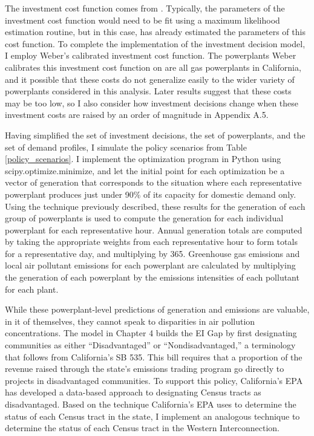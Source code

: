 The investment cost function comes from \cite{weber2021dynamic}. Typically, the parameters of the investment cost function would need to be fit using a maximum likelihood estimation routine, but in this case, \cite{weber2021dynamic} has already estimated the parameters of this cost function. To complete the implementation of the investment decision model, I employ Weber's calibrated investment cost function. The powerplants Weber calibrates this investment cost function on are all gas powerplants in California, and it possible that these costs do not generalize easily to the wider variety of powerplants considered in this analysis. Later results suggest that these costs may be too low, so I also consider how investment decisions change when these investment costs are raised by an order of magnitude in Appendix A.5. 

Having simplified the set of investment decisions, the set of powerplants, and the set of demand profiles, I simulate the policy scenarios from Table \ref{policy_scenarios}. I implement the optimization program in Python using scipy.optimize.minimize, and let the initial point for each optimization be a vector of generation that corresponds to the situation where each representative powerplant produces just under 90\% of its capacity for domestic demand only. Using the technique previously described, these results for the generation of each group of powerplants is used to compute the generation for each individual powerplant for each representative hour. Annual generation totals are computed by taking the appropriate weights from each representative hour to form totals for a representative day, and multiplying by 365. Greenhouse gas emissions and local air pollutant emissions for each powerplant are calculated by multiplying the generation of each powerplant by the emissions intensities of each pollutant for each plant. 

While these powerplant-level predictions of generation and emissions are valuable, in it of themselves, they cannot speak to disparities in air pollution concentrations. The model in Chapter 4 builds the EI Gap by first designating communities as either ``Disadvantaged'' or ``Nondisadvantaged,'' a terminology that follows from California's SB 535. This bill requires that a proportion of the revenue raised through the state's emissions trading program go directly to projects in disadvantaged communities. To support this policy, California's EPA has developed a data-based approach to designating Census tracts as disadvantaged. Based on the technique California's EPA uses to determine the status of each Census tract in the state, I implement an analogous technique to determine the status of each Census tract in the Western Interconnection. 

